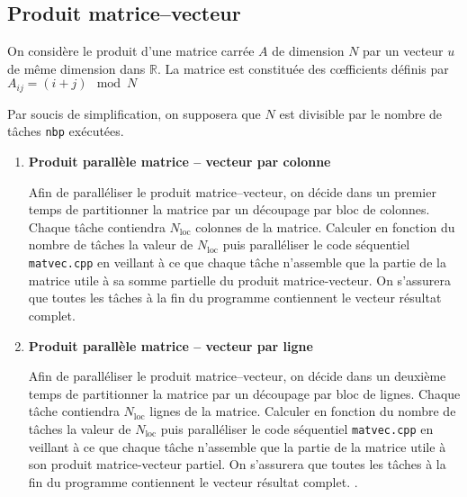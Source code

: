 \documentclass[11pt,a4paper]{article}
\begin{document}
\subsection{Produit matrice--vecteur}

On considère le produit d'une matrice carrée $A$  de dimension $N$ par un vecteur $u$ de même dimension dans $\mathbb{R}$. La matrice est constituée des c{\oe}fficients définis par $A_{ij} = (i+j) \mod N$

Par soucis de simplification, on supposera que $N$ est divisible par le nombre de tâches \texttt{nbp} exécutées.

\begin{enumerate}
\item \textbf{Produit parallèle  matrice -- vecteur par colonne}

Afin de paralléliser le produit matrice--vecteur, on décide dans un premier temps de partitionner la matrice par un découpage par bloc de colonnes. Chaque tâche contiendra $N_{\mbox{loc}}$ colonnes de la matrice. Calculer en fonction du nombre de tâches la valeur de $N_{\mbox{loc}}$ puis paralléliser le code séquentiel \texttt{matvec.cpp} en veillant à ce que chaque tâche n'assemble que la partie de la matrice utile à sa somme partielle du produit matrice-vecteur. On s'assurera que toutes les tâches à la fin du programme contiennent le vecteur résultat complet.

\item \textbf{Produit parallèle  matrice -- vecteur par ligne}

Afin de paralléliser le produit matrice--vecteur, on décide dans un deuxième temps de partitionner la matrice par un découpage par bloc de lignes. Chaque tâche contiendra $N_{\mbox{loc}}$ lignes de la matrice. Calculer en fonction du nombre de tâches la valeur de $N_{\mbox{loc}}$ puis paralléliser le code séquentiel \texttt{matvec.cpp} en veillant à ce que chaque tâche n'assemble que la partie de la matrice utile à son produit matrice-vecteur partiel. On s'assurera que toutes les tâches à la fin du programme contiennent le vecteur résultat complet.
.
\end{enumerate}
\end{document}
